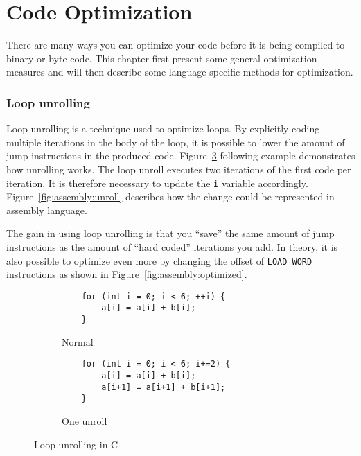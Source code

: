 \section{Code Optimization}

There are many ways you can optimize your code before it is being compiled to binary or byte code. This chapter first present some general optimization measures and will then describe some language specific methods for optimization.

\subsubsection{Loop unrolling}
Loop unrolling is a technique used to optimize loops. By explicitly coding multiple iterations in the body of the loop, it is possible to lower the amount of jump instructions in the produced code. Figure~\ref{fig:c:unroll} following example demonstrates how unrolling works. The loop unroll executes two iterations of the first code per iteration. It is therefore necessary to update the \texttt{i} variable accordingly. Figure~\ref{fig:assembly:unroll} describes how the change could be represented in assembly language.

The gain in using loop unrolling is that you \enquote{save} the same amount of jump instructions as the amount of \enquote{hard coded} iterations you add. In theory, it is also possible to optimize even more by changing the offset of \texttt{LOAD WORD} instructions as shown in Figure~\ref{fig:assembly:optimized}.

\begin{figure}
    \centering
    \begin{subfigure}{.5\textwidth}
        \centering
        \begin{verbatim}
    for (int i = 0; i < 6; ++i) {
        a[i] = a[i] + b[i];
    }

        \end{verbatim}
        \caption{Normal}
        \label{fig:c:unroll:normal}
    \end{subfigure}%
    \begin{subfigure}{.5\textwidth}
        \centering
        \begin{verbatim}
    for (int i = 0; i < 6; i+=2) {
        a[i] = a[i] + b[i];
        a[i+1] = a[i+1] + b[i+1];
    }
        \end{verbatim}
        \caption{One unroll}
        \label{fig:c:unroll:unroll}
    \end{subfigure}
    \caption{Loop unrolling in C}
    \label{fig:c:unroll}
\end{figure}


